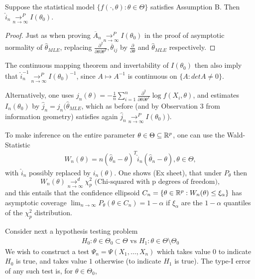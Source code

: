 \documentclass[a4paper]{article}
\begin{document}
\begin{prop}
	Suppose the statistical model $\{f\left( \cdot , \theta \right) : \theta \in \Theta \}$ satisfies Assumption B. Then $\hat{i}_n \underset{n\to \infty}{\to ^{P}} I(\theta_0) $.
\end{prop}

\begin{proof}
	Just as when proving $\overline{A}_n \underset{n\to \infty}{\to ^{P}} I(\theta_0)$ in the proof of asymptotic normality of $\hat{\theta}_{MLE}$,  replacing $\frac{\partial^2 }{\partial \theta \partial\theta^{T}}, \overline{\theta}_{ij} $ by $\frac{\partial }{\partial \theta} $ and $\hat{\theta}_{MLE}$ respectively.
\end{proof}

\begin{remark}
	The continuous mapping theorem and invertability of $I(\theta_0)$ then also imply that $\hat{i}_n^{-1} \underset{n\to \infty}{\to ^{P}} I(\theta_0)^{-1}$, since $A \mapsto A^{-1} $ is continuous on $\{A : det A \neq 0\} $.  
\end{remark}

Alternatively, one uses $j_n(\theta) = - \frac{1}{n} \sum_{i=1}^{n} \frac{\partial ^2}{\partial \theta\partial\theta^{T}} \log f(X_i, \theta) $, and estimates $I_n(\theta_0)$ by $\hat{j}_n = j_n(\hat{\theta}_{MLE}$, which as before (and by Observation 3 from information geometry) satisfies again $\hat{j}_n \underset{n\to \infty}{\to ^{P}} I(\theta_0)$).

To make inference on the entire parameter $\theta \in  \Theta \subseteq \mathbb{R}^{p}$, one can use the Wald-Statistic
\begin{align*}
	W_n(\theta) = n (\hat{\theta}_n - \theta)^{T} \hat{i}_n (\hat{\theta}_n - \theta), \theta \in \Theta
,\end{align*}
with $\hat{i}_n$ possibly replaced by $i_n(\theta)$. One shows (Ex sheet), that under $P_{\theta}$ then
 \[
	 W_n(\theta) \underset{n\to \infty}{\to ^{d}} \chi^2_{p} \text{ (Chi-squared with p degrees of freedom)}
,\] 
and this entails that the confidence ellipsoid $C_n = \{\theta \in \mathbb{R}^{p} : W_n(\theta) \le \xi_{\alpha}\} $ has asymptotic coverage $\lim_{n\to \infty} P_{\theta}(\theta \in C_n) = 1- \alpha$ if $\xi_{\alpha}$ are the $1- \alpha$ quantiles of the  $\chi^2_{p}$ distribution.

Consider next a hypothesis testing problem
\begin{align*}
	H_0 : \theta \in \Theta_0 \subset \Theta \text{ vs } H_1 : \theta \in \Theta\setminus\Theta_0
\end{align*}
We wish to construct a test $\Psi_n = \Psi(X_1, \ldots, X_n)$ which takes value $0$ to indicate $H_0$ is true, and takes value $1$ otherwise (to indicate $H_1$ is true). The type-I error of any such test is, for $\theta \in \Theta_0$,
\end{document}

